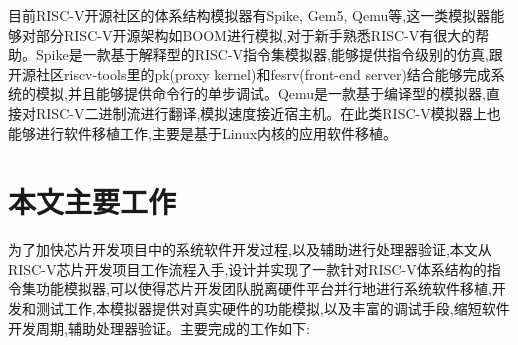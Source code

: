 目前RISC-V开源社区的体系结构模拟器有Spike, Gem5, Qemu\cite{bellard2005qemu}等,这一类模拟器能够对部分RISC-V开源架构如BOOM进行模拟,对于新手熟悉RISC-V有很大的帮助。Spike是一款基于解释型的RISC-V指令集模拟器,能够提供指令级别的仿真,跟开源社区riscv-tools里的pk(proxy kernel)和fesrv(front-end server)结合能够完成系统的模拟,并且能够提供命令行的单步调试。Qemu是一款基于编译型的模拟器,直接对RISC-V二进制流进行翻译,模拟速度接近宿主机。在此类RISC-V模拟器上也能够进行软件移植工作,主要是基于Linux内核的应用软件移植。



\section{本文主要工作}
为了加快芯片开发项目中的系统软件开发过程,以及辅助进行处理器验证\cite{asaad2012cycle,chaix2019implementation},本文从RISC-V芯片开发项目工作流程入手,设计并实现了一款针对RISC-V体系结构的指令集功能模拟器,可以使得芯片开发团队脱离硬件平台并行地进行系统软件移植,开发和测试工作\cite{ceze2003full,varga2010omnet++},本模拟器提供对真实硬件的功能模拟,以及丰富的调试手段,缩短软件开发周期,辅助处理器验证。主要完成的工作如下:


